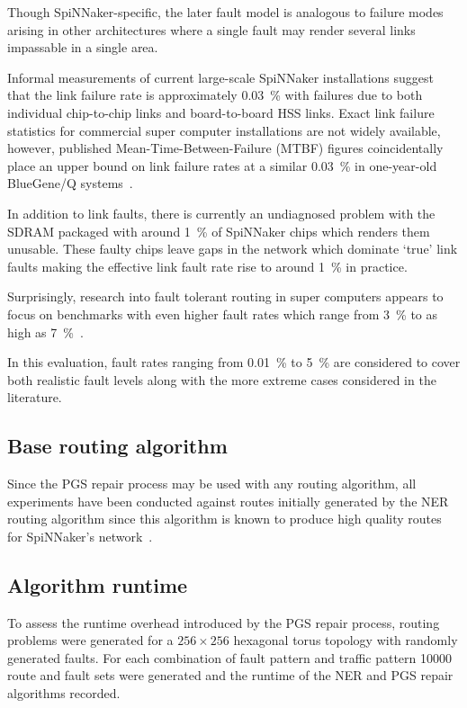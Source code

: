 			Though SpiNNaker-specific, the later fault model is analogous to failure
			modes arising in other architectures where a single fault may render
			several links impassable in a single area.
			
			Informal measurements of current large-scale SpiNNaker installations
			suggest that the link failure rate is approximately \SI{0.03}{\percent}
			with failures due to both individual chip-to-chip links and
			board-to-board HSS links. Exact link failure statistics for commercial
			super computer installations are not widely available, however, published
			Mean-Time-Between-Failure (MTBF) figures coincidentally place an upper
			bound on link failure rates at a similar \SI{0.03}{\percent} in
			one-year-old BlueGene/Q systems~\cite{chiu11}.
			
			In addition to link faults, there is currently an undiagnosed problem
			with the SDRAM packaged with around \SI{1}{\percent} of SpiNNaker chips
			which renders them unusable. These faulty chips leave gaps in the network
			which dominate `true' link faults making the effective link fault rate
			rise to around \SI{1}{\percent} in practice.
			
			Surprisingly, research into fault tolerant routing in super computers
			appears to focus on benchmarks with even higher fault rates which range
			from \SI{3}{\percent} to as high as
			\SI{7}{\percent}~\cite{ho04,gomez04,mejia06}.
			
			In this evaluation, fault rates ranging from \SI{0.01}{\percent} to
			\SI{5}{\percent} are considered to cover both realistic fault levels
			along with the more extreme cases considered in the literature.
		
		\subsection{Base routing algorithm}
			
			Since the PGS repair process may be used with any routing algorithm, all
			experiments have been conducted against routes initially generated by the
			NER routing algorithm since this algorithm is known to produce high
			quality routes for SpiNNaker's network~\cite{navaridas14}.
			
		\subsection{Algorithm runtime}
			
			To assess the runtime overhead introduced by the PGS repair process,
			routing problems were generated for a $256\times256$ hexagonal torus
			topology with randomly generated faults. For each combination of fault
			pattern and traffic pattern \num{10000} route and fault sets were
			generated and the runtime of the NER and PGS repair algorithms recorded.
			
